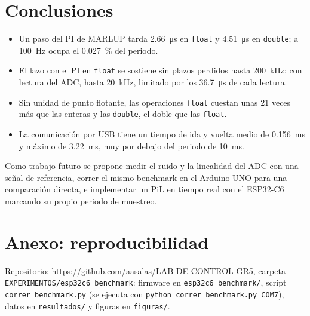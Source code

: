 \documentclass[conference]{IEEEtran}
\begin{document}
\section{Conclusiones}
\begin{itemize}
\item Un paso del PI de MARLUP tarda \SI{2.66}{\micro s} en \texttt{float} y \SI{4.51}{\micro s} en \texttt{double}; a \SI{100}{Hz} ocupa el \SI{0.027}{\percent} del periodo.
\item El lazo con el PI en \texttt{float} se sostiene sin plazos perdidos hasta \SI{200}{kHz}; con lectura del ADC, hasta \SI{20}{kHz}, limitado por los \SI{36.7}{\micro s} de cada lectura.
\item Sin unidad de punto flotante, las operaciones \texttt{float} cuestan unas 21 veces más que las enteras y las \texttt{double}, el doble que las \texttt{float}.
\item La comunicación por USB tiene un tiempo de ida y vuelta medio de \SI{0.156}{ms} y máximo de \SI{3.22}{ms}, muy por debajo del periodo de \SI{10}{ms}.
\end{itemize}
Como trabajo futuro se propone medir el ruido y la linealidad del ADC con una señal de referencia, correr el mismo benchmark en el Arduino UNO para una comparación directa, e implementar un PiL en tiempo real con el ESP32-C6 marcando su propio periodo de muestreo.

\appendix
\section*{Anexo: reproducibilidad}
Repositorio: \url{https://github.com/aasalas/LAB-DE-CONTROL-GR5}, carpeta \texttt{EXPERIMENTOS/esp32c6\_benchmark}: firmware en \texttt{esp32c6\_benchmark/}, script \texttt{correr\_benchmark.py} (se ejecuta con \texttt{python correr\_benchmark.py COM7}), datos en \texttt{resultados/} y figuras en \texttt{figuras/}.
\end{document}
